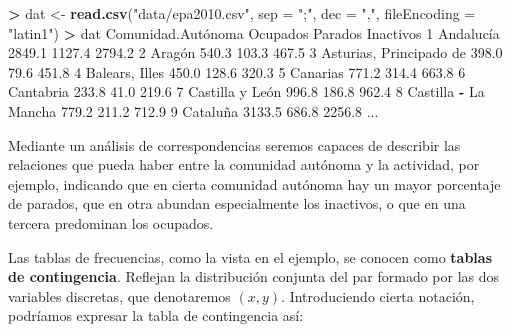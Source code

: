 \documentclass[
  a4paper,
  oneside]{scrbook}
\newenvironment{Shaded}{\begin{snugshade}}{\end{snugshade}}
\newcommand{\AttributeTok}[1]{\textcolor[rgb]{0.13,0.29,0.53}{#1}}
\newcommand{\DecValTok}[1]{\textcolor[rgb]{0.00,0.00,0.81}{#1}}
\newcommand{\FloatTok}[1]{\textcolor[rgb]{0.00,0.00,0.81}{#1}}
\newcommand{\FunctionTok}[1]{\textcolor[rgb]{0.13,0.29,0.53}{\textbf{#1}}}
\newcommand{\NormalTok}[1]{#1}
\newcommand{\OtherTok}[1]{\textcolor[rgb]{0.56,0.35,0.01}{#1}}
\newcommand{\SpecialCharTok}[1]{\textcolor[rgb]{0.81,0.36,0.00}{\textbf{#1}}}
\newcommand{\StringTok}[1]{\textcolor[rgb]{0.31,0.60,0.02}{#1}}
\theoremstyle{definition}
\theoremstyle{definition}
\theoremstyle{definition}
\theoremstyle{definition}
\theoremstyle{remark}
\begin{document}
\begin{Shaded}
\begin{Highlighting}[]
\SpecialCharTok{\textgreater{}}\NormalTok{ dat }\OtherTok{\textless{}{-}} \FunctionTok{read.csv}\NormalTok{(}\StringTok{"data/epa2010.csv"}\NormalTok{, }\AttributeTok{sep =} \StringTok{";"}\NormalTok{, }\AttributeTok{dec =} \StringTok{","}\NormalTok{, }\AttributeTok{fileEncoding =} \StringTok{"latin1"}\NormalTok{)}
\SpecialCharTok{\textgreater{}}\NormalTok{ dat}
\NormalTok{            Comunidad.Autónoma Ocupados Parados Inactivos}
\DecValTok{1}\NormalTok{                    Andalucía   }\FloatTok{2849.1}  \FloatTok{1127.4}    \FloatTok{2794.2}
\DecValTok{2}\NormalTok{                       Aragón    }\FloatTok{540.3}   \FloatTok{103.3}     \FloatTok{467.5}
\DecValTok{3}\NormalTok{      Asturias, Principado de    }\FloatTok{398.0}    \FloatTok{79.6}     \FloatTok{451.8}
\DecValTok{4}\NormalTok{               Balears, Illes    }\FloatTok{450.0}   \FloatTok{128.6}     \FloatTok{320.3}
\DecValTok{5}\NormalTok{                     Canarias    }\FloatTok{771.2}   \FloatTok{314.4}     \FloatTok{663.8}
\DecValTok{6}\NormalTok{                    Cantabria    }\FloatTok{233.8}    \FloatTok{41.0}     \FloatTok{219.6}
\DecValTok{7}\NormalTok{              Castilla y León    }\FloatTok{996.8}   \FloatTok{186.8}     \FloatTok{962.4}
\DecValTok{8}\NormalTok{         Castilla }\SpecialCharTok{{-}}\NormalTok{ La Mancha    }\FloatTok{779.2}   \FloatTok{211.2}     \FloatTok{712.9}
\DecValTok{9}\NormalTok{                     Cataluña   }\FloatTok{3133.5}   \FloatTok{686.8}    \FloatTok{2256.8}
\NormalTok{...}
\end{Highlighting}
\end{Shaded}

\normalsize

Mediante un análisis de correspondencias seremos capaces de describir
las relaciones que pueda haber entre la comunidad autónoma y la
actividad, por ejemplo, indicando que en cierta comunidad autónoma hay
un mayor porcentaje de parados, que en otra abundan especialmente los
inactivos, o que en una tercera predominan los ocupados.

Las tablas de frecuencias, como la vista en el ejemplo, se conocen como
\textbf{tablas de contingencia}. Reflejan la distribución conjunta del par
formado por las dos variables discretas, que denotaremos \((x,y)\).
Introduciendo cierta notación, podríamos expresar la tabla de
contingencia así:
\end{document}
